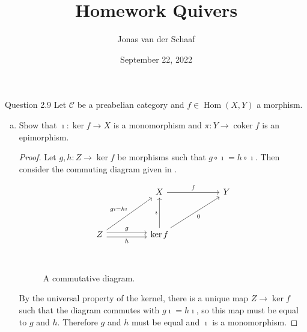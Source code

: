 \documentclass{article}
\title{Homework Quivers}
\author{Jonas van der Schaaf}
\date{September 22, 2022}
\newcommand{\incl}{\imath}
\DeclareMathOperator{\coker}{coker}
\DeclareMathOperator{\Hom}{Hom}
\newcommand{\cat}{\mathcal{C}}
\newenvironment{question}[1][]{\begin{paragraph}{Question #1}}{\end{paragraph}}
\theoremstyle{definition}
\begin{document}
\maketitle

\begin{question}[2.9]
    Let \(\cat\) be a preabelian category and \(f\in\Hom(X,Y)\) a morphism.

    \begin{enumerate}[a)]
        \item Show that \(\incl:\ker f\to X\) is a monomorphism and
              \(\pi:Y\to\coker f\) is an epimorphism.

              \begin{proof}
                  Let \(g,h:Z\to\ker f\) be morphisms such that
                  \(g\circ\incl=h\circ\incl\). Then consider the commuting
                  diagram given in .
                  \begin{figure}[H]
                      \[
                          \begin{tikzcd}
                              && X && Y \\
                              \\
                              Z && {\ker f} \\
                              &&& {}
                              \arrow["f", from=1-3, to=1-5]
                              \arrow["\imath", from=3-3, to=1-3]
                              \arrow["0"', from=3-3, to=1-5]
                              \arrow["{g\imath=h\imath}", from=3-1, to=1-3]
                              \arrow["h"', shift right=1, from=3-1, to=3-3]
                              \arrow["g", shift left=1, from=3-1, to=3-3]
                          \end{tikzcd}
                      \]
                      \caption{A commutative diagram.}
                      \label{fig:kernel-universal}
                  \end{figure}
                  By the universal property of the kernel, there is a unique map
                  \(Z\to\ker f\) such that the diagram commutes with
                  \(g\incl=h\incl\), so this map must be equal to \(g\) and
                  \(h\). Therefore \(g\) and \(h\) must be equal and \(\incl\)
                  is a monomorphism.


\end{proof}
\end{enumerate}
\end{question}
\end{document}
